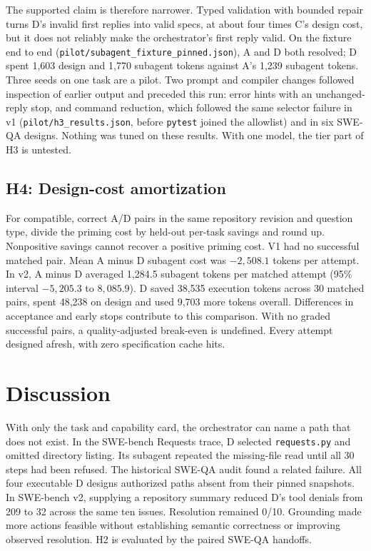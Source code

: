 \documentclass[sigconf,nonacm]{acmart}
\newcommand{\artifact}[1]{\nolinkurl{#1}}
\begin{document}
The supported claim is therefore narrower. Typed validation with bounded
repair turns D's invalid first replies into valid specs, at about four times
C's design cost, but it does not reliably make the orchestrator's first reply valid. On
the fixture end to end (\artifact{pilot/subagent_fixture_pinned.json}), A and
D both resolved; D spent 1,603 design and 1,770 subagent tokens against A's
1,239 subagent tokens. Three seeds on one task are a pilot. Two prompt and compiler changes
followed inspection of earlier output and preceded this run: error hints with
an unchanged-reply stop, and command reduction, which followed the same
selector failure in v1 (\artifact{pilot/h3_results.json}, before
\texttt{pytest} joined the allowlist) and in six SWE-QA designs. Nothing was
tuned on these results. With one model, the tier part of H3 is untested.

\subsection{H4: Design-cost amortization}
For compatible, correct A/D pairs in the same repository revision and
question type, divide the priming cost by held-out per-task savings and
round up. Nonpositive savings cannot recover a positive priming cost.
V1 had no successful matched pair.
Mean A minus D subagent cost was $-2{,}508.1$ tokens per attempt.
In v2, A minus D averaged 1,284.5 subagent tokens per matched attempt
(95\% interval $-5{,}205.3$ to $8{,}085.9$). D saved 38,535 execution
tokens across 30 matched pairs, spent 48,238 on design and used 9,703
more tokens overall. Differences in acceptance and early stops contribute
to this comparison. With no graded successful pairs, a quality-adjusted
break-even is undefined. Every attempt designed afresh, with zero
specification cache hits.

\section{Discussion}
With only the task and capability card, the orchestrator can name a path
that does not exist. In the SWE-bench Requests trace, D selected
\texttt{requests.py} and omitted directory listing. Its subagent repeated
the missing-file read until all 30 steps had been refused. The historical
SWE-QA audit found a related failure. All four executable D designs
authorized paths absent from their pinned snapshots. In SWE-bench v2,
supplying a repository summary reduced D's tool denials from 209 to 32
across the same ten issues. Resolution remained 0/10. Grounding made
more actions feasible without establishing semantic correctness or
improving observed resolution. H2 is evaluated by the paired SWE-QA
handoffs.
\end{document}
